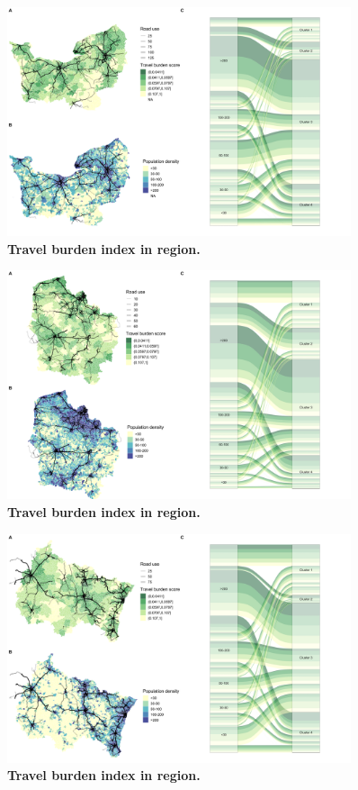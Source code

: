\begin{figure}[H]
    \includegraphics[width=0.9\textwidth]{images/routes/fig4_28.png}
    \centering
    \caption{
        \textbf{Travel burden index in region.}
    }
\end{figure}

\begin{figure}[H]
    \includegraphics[width=0.9\textwidth]{images/routes/fig4_32.png}
    \centering
    \caption{
        \textbf{Travel burden index in region.}
    }
\end{figure}

\begin{figure}[H]
    \includegraphics[width=0.9\textwidth]{images/routes/fig4_44.png}
    \centering
    \caption{
        \textbf{Travel burden index in region.}
    }
\end{figure}


